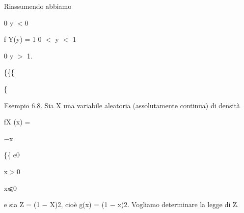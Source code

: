 \documentclass[a4paper,portrait,12pt]{article}
\begin{document}
\begin{flushleft}
Riassumendo abbiamo
\end{flushleft}





\begin{flushleft}
0 y $<$0
\end{flushleft}


\begin{flushleft}
f Y(y) = 1 0 $<$ y $<$ 1
\end{flushleft}


\begin{flushleft}
0 y $>$ 1.
\end{flushleft}





\{\{\{


\{





\begin{flushleft}
Esempio 6.8. Sia X una variabile aleatoria (assolutamente continua) di densit\`{a}
\end{flushleft}


\begin{flushleft}
fX (x) =
\end{flushleft}





\begin{flushleft}
$-$x
\end{flushleft}





\begin{flushleft}
\{\{ e0
\end{flushleft}





\begin{flushleft}
x$>$0
\end{flushleft}


\begin{flushleft}
x⩽0
\end{flushleft}





\begin{flushleft}
e sia Z = (1 $-$ X)2, cio\`{e} g(x) = (1 $-$ x)2. Vogliamo determinare la legge di Z.
\end{flushleft}
\end{document}
